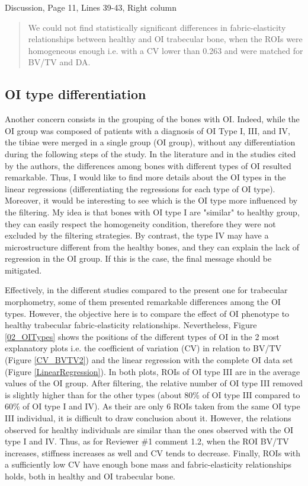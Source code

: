 \documentclass{AR2RC}
\begin{document}
Discussion, Page 11, Lines 39-43, Right column
\begin{quote}
	We could not find statistically significant differences in fabric-elasticity relationships between healthy and OI trabecular bone, when the ROIs were homogeneous enough i.e. with a CV lower than 0.263 and were matched for BV/TV and DA.
\end{quote}

\subsection{OI type differentiation}

\RC Another concern consists in the grouping of the bones with OI. Indeed, while the OI group was composed of patients with a diagnosis of OI Type I, III, and IV, the tibiae were merged in a single group (OI group), without any differentiation during the following steps of the study. In the literature and in the studies cited by the authors, the differences among bones with different types of OI resulted remarkable. Thus, I would like to find more details about the OI types in the linear regressions (differentiating the regressions for each type of OI type). Moreover, it would be interesting to see which is the OI type more influenced by the filtering. My idea is that bones with OI type I are "similar" to healthy group, they can easily respect the homogeneity condition, therefore they were not excluded by the filtering strategies. By contrast, the type IV may have a microstructure different from the healthy bones, and they can explain the lack of regression in the OI group. If this is the case, the final message should be mitigated.

\AR Effectively, in the different studies compared to the present one for trabecular morphometry, some of them presented remarkable differences among the OI types. However, the objective here is to compare the effect of OI phenotype to healthy trabecular fabric-elasticity relationships. Nevertheless, Figure \ref{02_OITypes} shows the positions of the different types of OI in the 2 most explanatory plots i.e. the coefficient of variation (CV) in relation to BV/TV (Figure \ref{CV_BVTV2}) and the linear regression with the complete OI data set (Figure \ref{LinearRegression}). In both plots, ROIs of OI type III are in the average values of the OI group. After filtering, the relative number of OI type III removed is slightly higher than for the other types (about 80\% of OI type III compared to 60\% of OI type I and IV). As their are only 6 ROIs taken from the same OI type III individual, it is difficult to draw conclusion about it. However, the relations observed for healthy individuals are similar than the ones observed with the OI type I and IV. Thus, as for Reviewer \#1 comment 1.2, when the ROI BV/TV increases, stiffness increases as well and CV tends to decrease. Finally, ROIs with a sufficiently low CV have enough bone mass and fabric-elasticity relationships holds, both in healthy and OI trabecular bone.
\end{document}
